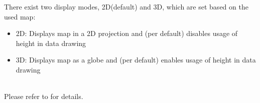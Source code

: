 There exist two display modes, 2D(default) and 3D, which are set based on the used map:

\begin{itemize}
 \item 2D: Displays map in a 2D projection and (per default) disables usage of height in data drawing
 \item 3D: Displays map as a globe and (per default) enables usage of height in data drawing
\end{itemize}
\ \\
Please refer to  for details.
